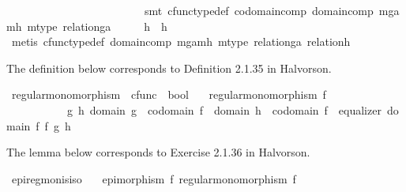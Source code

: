 \begin{isabellebody}
\ \ \ \ \ \ \ \ \ \ \ \ \ \ \ \ \ \ \ \ \ \ \ \ \ smt\ cfunc{\isacharunderscore}{\kern0pt}type{\isacharunderscore}{\kern0pt}def\ codomain{\isacharunderscore}{\kern0pt}comp\ domain{\isacharunderscore}{\kern0pt}comp\ m{\isacharunderscore}{\kern0pt}ga{\isacharunderscore}{\kern0pt}mh\ m{\isacharunderscore}{\kern0pt}type\ relation{\isacharunderscore}{\kern0pt}ga{\isacharparenright}{\kern0pt}\isanewline
\ \ \isamarkupfalse%
\ \isamarkupfalse%
\ {\isachardoublequoteopen}h{}\ {\isacharequal}{\kern0pt}\ h{}{\isachardoublequoteclose}\isanewline
\ \ \ \ \isamarkupfalse%
\ {\isacharparenleft}{\kern0pt}metis\ cfunc{\isacharunderscore}{\kern0pt}type{\isacharunderscore}{\kern0pt}def\ domain{\isacharunderscore}{\kern0pt}comp\ m{\isacharunderscore}{\kern0pt}ga{\isacharunderscore}{\kern0pt}mh\ m{\isacharunderscore}{\kern0pt}type\ relation{\isacharunderscore}{\kern0pt}ga\ relation{\isacharunderscore}{\kern0pt}h{\isacharparenright}{\kern0pt}\isanewline
{}\isamarkupfalse%
%
\endisatagproof
{\isafoldproof}%
%
\isadelimproof
%
\endisadelimproof
%
\begin{isamarkuptext}%
The definition below corresponds to Definition 2.1.35 in Halvorson.%
\end{isamarkuptext}\isamarkuptrue%
\isamarkupfalse%
\ regular{\isacharunderscore}{\kern0pt}monomorphism\ {\isacharcolon}{\kern0pt}{\isacharcolon}{\kern0pt}\ {\isachardoublequoteopen}cfunc\ {\isasymRightarrow}\ bool{\isachardoublequoteclose}\isanewline
\ \ \ {\isachardoublequoteopen}regular{\isacharunderscore}{\kern0pt}monomorphism\ f\ \ {\isasymlongleftrightarrow}\ \ \isanewline
\ \ \ \ \ \ \ \ \ \ {\isacharparenleft}{\kern0pt}{\isasymexists}\ g\ h{\isachardot}{\kern0pt}\ domain\ g\ {\isacharequal}{\kern0pt}\ codomain\ f\ {\isasymand}\ domain\ h\ {\isacharequal}{\kern0pt}\ codomain\ f\ {\isasymand}\ equalizer\ {\isacharparenleft}{\kern0pt}domain\ f{\isacharparenright}{\kern0pt}\ f\ g\ h{\isacharparenright}{\kern0pt}{\isachardoublequoteclose}%
\begin{isamarkuptext}%
The lemma below corresponds to Exercise 2.1.36 in Halvorson.%
\end{isamarkuptext}\isamarkuptrue%
\isamarkupfalse%
\ epi{\isacharunderscore}{\kern0pt}regmon{\isacharunderscore}{\kern0pt}is{\isacharunderscore}{\kern0pt}iso{\isacharcolon}{\kern0pt}\isanewline
\ \ \ {\isachardoublequoteopen}epimorphism\ f{\isachardoublequoteclose}\ {\isachardoublequoteopen}regular{\isacharunderscore}{\kern0pt}monomorphism\ f{\isachardoublequoteclose}\isanewline

\end{isabellebody}
